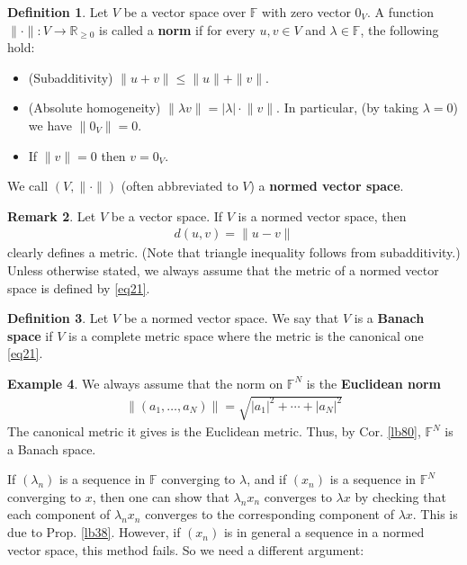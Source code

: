 \documentclass[12pt,b5paper,notitlepage]{article}
\theoremstyle{definition}
\newtheorem{df}{Definition}[section]
\newtheorem{eg}[df]{Example}
\newtheorem{rem}[df]{Remark}
\theoremstyle{plain}
\newcommand{\Rbb}{\mathbb R}
\newcommand{\Fbb}{\mathbb F}
\numberwithin{equation}{section}
\begin{document}
\begin{df}
Let $V$ be a vector space over $\Fbb$ with zero vector $0_V$. A function $\lVert\cdot\lVert:V\rightarrow\Rbb_{\geq 0}$ is called a \textbf{norm}  if for every $u,v\in V$ and $\lambda\in\Fbb$, the following hold:
\begin{itemize}
\item (Subadditivity) $\lVert u+v\lVert\leq \lVert u\lVert+\lVert v\lVert$. 
\item (Absolute homogeneity) $\lVert\lambda v\lVert=|\lambda|\cdot \lVert v\lVert$. In particular, (by taking $\lambda=0$) we have $\lVert 0_V\lVert=0$.
\item If $\lVert v\lVert=0$ then $v=0_V$.
\end{itemize}
We call $(V,\lVert\cdot\lVert)$ (often abbreviated to $V$) a \textbf{normed vector space}. 
\end{df}

\begin{rem}
Let $V$ be a vector space. If $V$ is a normed vector space, then
\begin{align}
d(u,v)=\lVert u-v\lVert  \label{eq21}
\end{align} 
clearly defines a metric. (Note that triangle inequality follows from subadditivity.) Unless otherwise stated, we always assume that the metric of a normed vector space is defined by \eqref{eq21}.
\end{rem}




\begin{df}
Let $V$ be a normed vector space. We say that $V$ is a \textbf{Banach space}  if $V$ is a complete metric space where the metric is the canonical one \eqref{eq21}.
\end{df}




\begin{eg}
We always assume that the norm on $\Fbb^N$ is the \textbf{Euclidean norm} 
\begin{align}
\lVert (a_1,\dots,a_N)\lVert=\sqrt{|a_1|^2+\cdots+|a_N|^2}
\end{align}
The canonical metric it gives is the Euclidean metric. Thus, by Cor. \ref{lb80}, $\Fbb^N$ is a Banach space.
\end{eg}



If $(\lambda_n)$ is a sequence in $\Fbb$ converging to $\lambda$, and if $(x_n)$ is a sequence in $\Fbb^N$ converging to $x$, then one can show that $\lambda_nx_n$ converges to $\lambda x$ by checking that each component of $\lambda_nx_n$ converges to the corresponding component of $\lambda x$. This is due to Prop. \ref{lb38}. However, if $(x_n)$ is in general a sequence in a normed vector space, this method fails. So we need a different argument:
\end{document}
